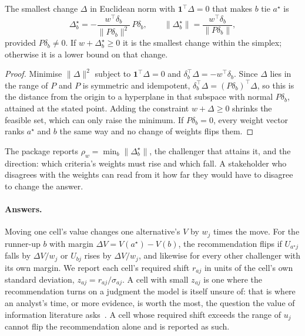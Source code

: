 \begin{proposition}
\label{prop:weights}
The smallest change $\Delta$ in Euclidean norm with $\mathbf{1}^{\top}\Delta = 0$
that makes $b$ tie $a^\star$ is
\begin{equation}
  \Delta^\star_b = -\frac{w^{\top}\delta_b}{\lVert P\delta_b\rVert^2}\,
  P\delta_b, \qquad
  \lVert \Delta^\star_b \rVert = \frac{w^{\top}\delta_b}{\lVert P\delta_b\rVert},
  \label{eq:weightflip}
\end{equation}
provided $P\delta_b \ne 0$. If $w + \Delta^\star_b \ge 0$ it is the smallest
change within the simplex; otherwise it is a lower bound on that change.
\end{proposition}
\begin{proof}
Minimise $\lVert\Delta\rVert^2$ subject to $\mathbf{1}^{\top}\Delta = 0$ and
$\delta_b^{\top}\Delta = -w^{\top}\delta_b$. Since $\Delta$ lies in the range
of $P$ and $P$ is symmetric and idempotent,
$\delta_b^{\top}\Delta = (P\delta_b)^{\top}\Delta$, so this is the distance
from the origin to a hyperplane in that subspace with normal $P\delta_b$,
attained at the stated point. Adding the constraint $w + \Delta \ge 0$
shrinks the feasible set, which can only raise the minimum. If $P\delta_b = 0$,
every weight vector ranks $a^\star$ and $b$ the same way and no change of
weights flips them.
\end{proof}

The package reports $\rho_w = \min_b \lVert\Delta^\star_b\rVert$, the
challenger that attains it, and the direction: which criteria's weights must
rise and which fall. A stakeholder who disagrees with the weights can read
from it how far they would have to disagree to change the answer.

\paragraph{Answers.}
Moving one cell's value changes one alternative's $V$ by $w_j$ times the
move. For the runner-up $b$ with margin $\Delta V = V(a^\star) - V(b)$, the
recommendation flips if $U_{a^\star j}$ falls by $\Delta V / w_j$ or $U_{bj}$
rises by $\Delta V / w_j$, and likewise for every other challenger with its own
margin. We report each cell's required shift $r_{aj}$ in units of the cell's
own standard deviation, $z_{aj} = r_{aj}/\sigma_{aj}$. A cell with small
$z_{aj}$ is one where the recommendation turns on a judgment the model is
itself unsure of: that is where an analyst's time, or more evidence, is worth
the most, the question the value of information literature
asks~\cite{howard1966}. A cell whose required shift exceeds the range of $u_j$
cannot flip the recommendation alone and is reported as such.

